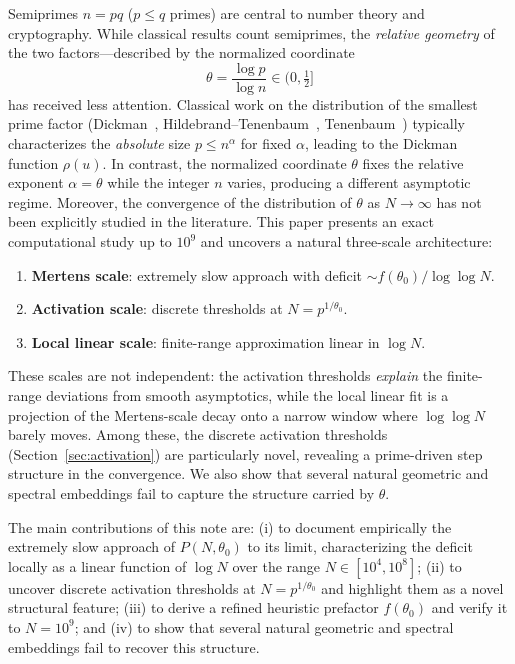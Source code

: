 \documentclass[11pt]{article}
\theoremstyle{definition}
\begin{document}
Semiprimes \(n = pq\) (\(p \le q\) primes) are central to number theory and
cryptography.  While classical results count semiprimes, the \emph{relative geometry}
of the two factors---described by the normalized coordinate
\[
  \theta = \frac{\log p}{\log n} \in (0,\tfrac{1}{2}]
\]
has received less attention.  Classical work on the distribution of the smallest
prime factor (Dickman~\cite{dickman1930}, Hildebrand--Tenenbaum~\cite{hildebrand1993},
Tenenbaum~\cite{tenenbaum1995}) typically characterizes the \emph{absolute} size
\(p \le n^{\alpha}\) for fixed \(\alpha\), leading to the Dickman function \(\rho(u)\).
In contrast, the normalized coordinate \(\theta\) fixes the relative exponent
\(\alpha = \theta\) while the integer \(n\) varies, producing a different asymptotic
regime.  Moreover, the convergence of the distribution of \(\theta\) as \(N\to\infty\)
has not been explicitly studied in the literature.  This paper presents an exact
computational study up to \(10^9\) and uncovers a natural three-scale architecture:
\begin{enumerate}[leftmargin=*]
  \item \textbf{Mertens scale}: extremely slow approach with deficit
        \(\sim f(\theta_0)/\log\log N\).
  \item \textbf{Activation scale}: discrete thresholds at \(N = p^{1/\theta_0}\).
  \item \textbf{Local linear scale}: finite-range approximation linear in \(\log N\).
\end{enumerate}
These scales are not independent: the activation thresholds \emph{explain} the
finite-range deviations from smooth asymptotics, while the local linear fit is a
projection of the Mertens-scale decay onto a narrow window where \(\log\log N\)
barely moves.
Among these, the discrete activation thresholds (Section~\ref{sec:activation}) are
particularly novel, revealing a prime-driven step structure in the convergence.
We also show that several natural geometric and spectral embeddings fail to capture
the structure carried by \(\theta\).

The main contributions of this note are:
(i) to document empirically the extremely slow approach of \(P(N,\theta_0)\) to its
limit, characterizing the deficit locally as a linear function of \(\log N\) over the
range \(N \in [10^4, 10^8]\);
(ii) to uncover discrete activation thresholds at \(N = p^{1/\theta_0}\) and highlight
them as a novel structural feature;
(iii) to derive a refined heuristic prefactor \(f(\theta_0)\) and verify it to
\(N = 10^9\); and
(iv) to show that several natural geometric and spectral embeddings fail to recover
this structure.
\end{document}
